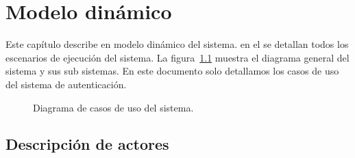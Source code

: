 \chapter{Modelo dinámico}	
\label{cap:modDinamico}

Este capítulo describe en modelo dinámico del sistema. en el se detallan todos los escenarios de ejecución del sistema. La figura~\ref{fig:casosDeUso} muestra el diagrama general del sistema y sus sub sistemas. En este documento solo detallamos los casos de uso del sistema de autenticación.

\begin{figure}[htbp]
	\begin{center}
		\caption{Diagrama de casos de uso del sistema.}
		\label{fig:casosDeUso}
	\end{center}
\end{figure}

\section{Descripción de actores}

